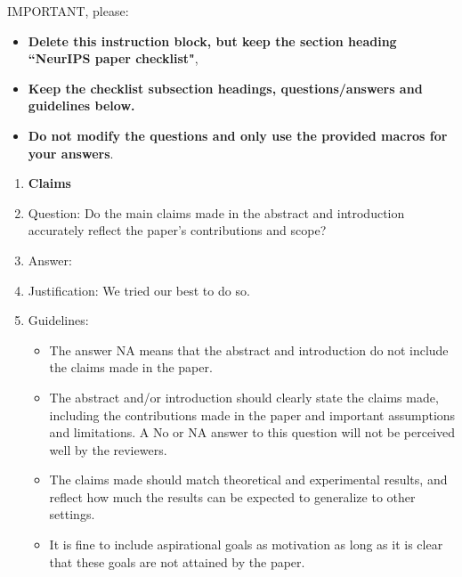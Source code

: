 IMPORTANT, please:
\begin{itemize}
\item {\bf Delete this instruction block, but keep the section heading ``NeurIPS paper checklist"},
\item  {\bf Keep the checklist subsection headings, questions/answers and guidelines below.}
\item {\bf Do not modify the questions and only use the provided macros for your answers}.
\end{itemize}




\begin{enumerate}

\item {\bf Claims}
\item[] Question: Do the main claims made in the abstract and introduction accurately reflect the paper's contributions and scope?
\item[] Answer: \answerYes{} %
\item[] Justification: We tried our best to do so. 
\item[] Guidelines:
  \begin{itemize}
  \item The answer NA means that the abstract and introduction do not include the claims made in the paper.
  \item The abstract and/or introduction should clearly state the claims made, including the contributions made in the paper and important assumptions and limitations. A No or NA answer to this question will not be perceived well by the reviewers.
  \item The claims made should match theoretical and experimental results, and reflect how much the results can be expected to generalize to other settings.
  \item It is fine to include aspirational goals as motivation as long as it is clear that these goals are not attained by the paper.
  \end{itemize}


\end{enumerate}
